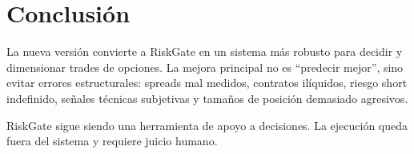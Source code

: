 \documentclass[11pt,letterpaper]{article}
\begin{document}
\section{Conclusión}

La nueva versión convierte a RiskGate en un sistema más robusto para decidir y dimensionar trades de opciones. La mejora principal no es ``predecir mejor'', sino evitar errores estructurales: spreads mal medidos, contratos ilíquidos, riesgo short indefinido, señales técnicas subjetivas y tamaños de posición demasiado agresivos.

RiskGate sigue siendo una herramienta de apoyo a decisiones. La ejecución queda fuera del sistema y requiere juicio humano.
\end{document}
